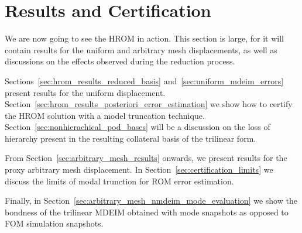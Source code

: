 \documentclass[../../thesis.tex]{subfiles}
\begin{document}
\section{Results and Certification}
\label{sec:results_and_certification}
We are now going to see the HROM in action.
This section is large, for it will contain results for 
the uniform and arbitrary mesh displacements, 
as well as discussions on the effects observed during the reduction process.

Sections~\ref{sec:hrom_results_reduced_basis} and~\ref{sec:uniform_mdeim_errors}
present results for the uniform displacement.
Section~\ref{sec:hrom_results_posteriori_error_estimation} we show 
how to certify the HROM solution with a model truncation technique. 
Section~\ref{sec:nonhierachical_pod_bases} will be a discussion on
the loss of hierarchy present in the resulting collateral basis
of the trilinear form. 

From Section~\ref{sec:arbitrary_mesh_results} onwards, 
we present results for the proxy arbitrary mesh displacement.
In Section~\ref{sec:certification_limits} we discuss the limits of modal trunction
for ROM error estimation. 

Finally, in Section~\ref{sec:arbitrary_mesh_nmdeim_mode_evaluation} we show the bondness
of the trilinear MDEIM obtained with mode snapshots as opposed to FOM simulation snapshots.
\end{document}
